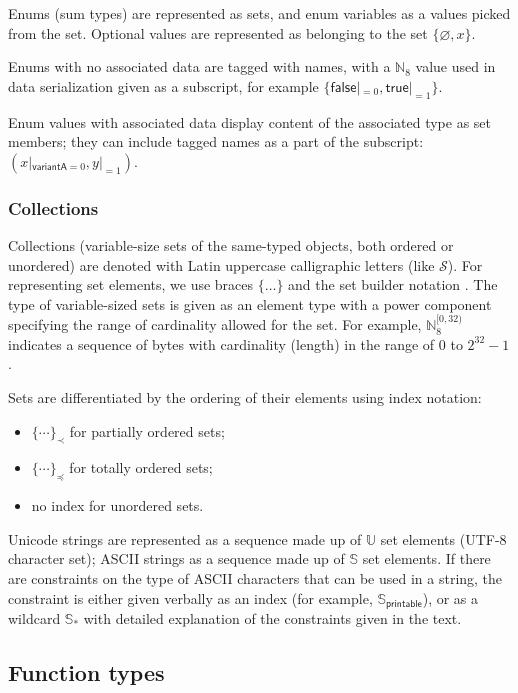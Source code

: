 \documentclass[9pt,oneside]{amsart}
\begin{document}
\begin{multicols}{2}
Enums (sum types) are represented as sets, and enum variables as a values picked from the set.
Optional values are represented as belonging to the set $\{ \varnothing, x \}$.

Enums with no associated data are tagged with names,
with a $\mathbb{N}_8$ value used in data serialization given as a subscript,
for example $\{ \mathsf{false}|_{=0}, \mathsf{true}|_{=1} \}$.

Enum values with associated data display content of the associated type as set members;
they can include tagged names as a part of the subscript: $( x|_{\mathsf{variantA}=0}, y|_{=1})$.

\subsubsection{Collections}

Collections (variable-size sets of the same-typed objects, both ordered or unordered)
are denoted with Latin uppercase calligraphic letters (like $\mathcal{S}$).
For representing set elements, we use braces $\{\ldots\}$ and the set builder notation \cite{setbuilder}.
The type of variable-sized sets is given as an element type with a power component
specifying the range of cardinality allowed for the set.
For example, $\mathbb{N}_8^{[0, 32)}$ indicates a sequence of bytes with cardinality (length)
in the range of $0$ to $2^{32} - 1$.

Sets are differentiated by the ordering of their elements using index notation:
\begin{itemize}
    \item $\{ \cdots \}_\prec$ for partially ordered sets;
    \item $\{ \cdots \}_\preceq$ for totally ordered sets;
    \item no index for unordered sets.
\end{itemize}

Unicode strings are represented as a sequence made up of $\mathbb{U}$ set elements
(UTF-8 character set); ASCII strings as a sequence made up of $\mathbb{S}$ set elements.
If there are constraints on the type of ASCII characters that can be used in a string,
the constraint is either given verbally as an index (for example, $\mathbb{S}_\mathsf{printable}$),
or as a wildcard $\mathbb{S}_*$ with detailed explanation of the constraints given in the text.

\subsection{Function types}


\end{multicols}
\end{document}
